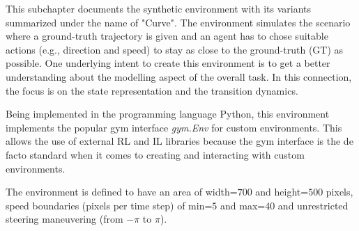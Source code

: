 This subchapter documents the synthetic environment with its variants summarized under the name of "Curve". The environment simulates the scenario where a ground-truth trajectory is given and an agent has to chose suitable actions (e.g., direction and speed) to stay as close to the ground-truth (GT) as possible. One underlying intent to create this environment is to get a better understanding about the modelling aspect of the overall task. In this connection, the focus is on the state representation and the transition dynamics.
\par
Being implemented in the programming language Python, this environment implements the popular gym interface \textit{gym.Env} \cite[]{gym} for custom environments. This allows the use of external RL and IL libraries because the gym interface is the de facto standard when it comes to creating and interacting with custom environments.
\par
The environment is defined to have an area of width=$700$ and height=$500$ pixels, speed boundaries (pixels per time step) of min=$5$ and max=$40$ and unrestricted steering maneuvering (from $-\pi$ to $\pi$).